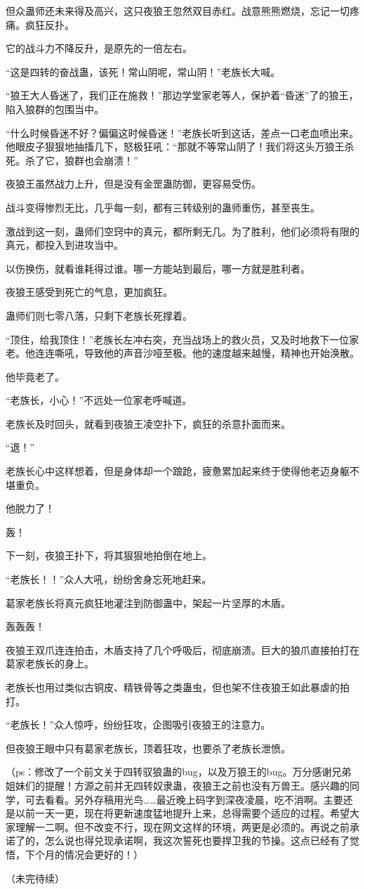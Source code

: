\begin{this_body}
但众蛊师还未来得及高兴，这只夜狼王忽然双目赤红。战意熊熊燃烧，忘记一切疼痛。疯狂反扑。

它的战斗力不降反升，是原先的一倍左右。

“这是四转的奋战蛊，该死！常山阴呢，常山阴！”老族长大喊。

“狼王大人昏迷了，我们正在施救！”那边学堂家老等人，保护着“昏迷”了的狼王，陷入狼群的包围当中。

“什么时候昏迷不好？偏偏这时候昏迷！”老族长听到这话，差点一口老血喷出来。他眼皮子狠狠地抽搐几下，怒极狂吼：“那就不等常山阴了！我们将这头万狼王杀死。杀了它，狼群也会崩溃！”

夜狼王虽然战力上升，但是没有金罡蛊防御，更容易受伤。

战斗变得惨烈无比，几乎每一刻，都有三转级别的蛊师重伤，甚至丧生。

激战到这一刻，蛊师们空窍中的真元，都所剩无几。为了胜利，他们必须将有限的真元，都投入到进攻当中。

以伤换伤，就看谁耗得过谁。哪一方能站到最后，哪一方就是胜利者。

夜狼王感受到死亡的气息，更加疯狂。

蛊师们则七零八落，只剩下老族长死撑着。

“顶住，给我顶住！”老族长左冲右突，充当战场上的救火员，又及时地救下一位家老。他连连嘶吼，导致他的声音沙哑至极。他的速度越来越慢，精神也开始涣散。

他毕竟老了。

“老族长，小心！”不远处一位家老呼喊道。

老族长及时回头，就看到夜狼王凌空扑下，疯狂的杀意扑面而来。

“退！”

老族长心中这样想着，但是身体却一个踉跄，疲惫累加起来终于使得他老迈身躯不堪重负。

他脱力了！

轰！

下一刻，夜狼王扑下，将其狠狠地拍倒在地上。

“老族长！！”众人大吼，纷纷舍身忘死地赶来。

葛家老族长将真元疯狂地灌注到防御蛊中，架起一片坚厚的木盾。

轰轰轰！

夜狼王双爪连连拍击，木盾支持了几个呼吸后，彻底崩溃。巨大的狼爪直接拍打在葛家老族长的身上。

老族长也用过类似古铜皮、精铁骨等之类蛊虫，但也架不住夜狼王如此暴虐的拍打。

“老族长！”众人惊呼，纷纷狂攻，企图吸引夜狼王的注意力。

但夜狼王眼中只有葛家老族长，顶着狂攻，也要杀了老族长泄愤。

（ps：修改了一个前文关于四转驭狼蛊的bug，以及万狼王的bug。万分感谢兄弟姐妹们的提醒！方源之前并无四转奴隶蛊，夜狼王之前也没有万兽王。感兴趣的同学，可去看看。另外存稿用光鸟……最近晚上码字到深夜凌晨，吃不消啊。主要还是以前一天一更，现在将更新速度猛地提升上来，总得需要个适应的过程。希望大家理解一二啊。但不改变不行，现在网文这样的环境，两更是必须的。再说之前承诺了的，怎么说也得兑现承诺啊，我这次誓死也要捍卫我的节操。这点已经有了觉悟，下个月的情况会更好的！）

（未完待续）

\end{this_body}

